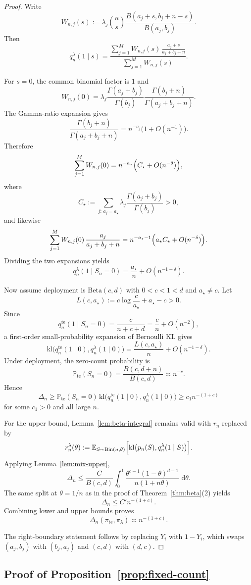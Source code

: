 \documentclass{article}
\theoremstyle{definition}
\theoremstyle{remark}
\newcommand{\E}{\mathbb{E}}
\newcommand{\Pbb}{\mathbb{P}}
\newcommand{\BetaDist}{\mathrm{Beta}}
\newcommand{\Bin}{\mathrm{Bin}}
\newcommand{\te}{\mathrm{te}}
\newcommand{\klb}{\mathrm{kl}}
\newcommand{\dd}{\,\mathrm{d}}
\begin{document}
\begin{proof}
	Write
	\[
W_{n,j}(s)
:=
\lambda_j \binom{n}{s}\frac{B(a_j+s,b_j+n-s)}{B(a_j,b_j)}.
\]
Then
\[
q_n^\lambda(1\mid s)
=
\frac{\sum_{j=1}^M W_{n,j}(s)\,\frac{a_j+s}{a_j+b_j+n}}
{\sum_{j=1}^M W_{n,j}(s)}.
\]

For $s=0$, the common binomial factor is $1$ and
\[
W_{n,j}(0)
=
\lambda_j \frac{\Gamma(a_j+b_j)}{\Gamma(b_j)}
\frac{\Gamma(b_j+n)}{\Gamma(a_j+b_j+n)}.
\]
The Gamma-ratio expansion gives
\[
\frac{\Gamma(b_j+n)}{\Gamma(a_j+b_j+n)}
=
n^{-a_j}\bigl(1+O(n^{-1})\bigr).
\]
Therefore
\[
\sum_{j=1}^M W_{n,j}(0)
=
n^{-a_\star}\Bigl(C_\star + O(n^{-\delta})\Bigr),
\]
where
\[
C_\star
:=
\sum_{j:\,a_j=a_\star}
\lambda_j\frac{\Gamma(a_j+b_j)}{\Gamma(b_j)}
>0,
\]
and likewise
\[
\sum_{j=1}^M W_{n,j}(0)\,\frac{a_j}{a_j+b_j+n}
=
n^{-a_\star-1}
\Bigl(a_\star C_\star + O(n^{-\delta})\Bigr).
\]
Dividing the two expansions yields
\[
q_n^\lambda(1\mid S_n=0)
=
\frac{a_\star}{n}+O(n^{-1-\delta}).
\]

Now assume deployment is $\BetaDist(c,d)$ with $0<c<1<d$ and $a_\star\neq c$. Let
\[
L(c,a_\star):=c\log\frac{c}{a_\star}+a_\star-c>0.
\]
Since
\[
q_n^{\te}(1\mid S_n=0)=\frac{c}{n+c+d}=\frac{c}{n}+O(n^{-2}),
\]
a first-order small-probability expansion of Bernoulli KL gives
\[
\klb\bigl(q_n^{\te}(1\mid 0),q_n^\lambda(1\mid 0)\bigr)
=
\frac{L(c,a_\star)}{n}+O(n^{-1-\delta}).
\]
Under deployment, the zero-count probability is
\[
\Pbb_{\te}(S_n=0)
=
\frac{B(c,d+n)}{B(c,d)}
\asymp n^{-c}.
\]
Hence
\[
\Delta_n
\ge
\Pbb_{\te}(S_n=0)\,
\klb\bigl(q_n^{\te}(1\mid 0),q_n^\lambda(1\mid 0)\bigr)
\ge
c_1 n^{-(1+c)}
\]
for some $c_1>0$ and all large $n$.

For the upper bound, Lemma~\ref{lem:beta-integral} remains valid with $r_n$ replaced by
\[
r_n^\lambda(\theta)
:=
\E_{S\sim \Bin(n,\theta)}
\Bigl[
\klb\bigl(p_n(S),q_n^\lambda(1\mid S)\bigr)
\Bigr].
\]
Applying Lemma~\ref{lem:mix-upper},
\[
\Delta_n
\le
\frac{C}{B(c,d)}
\int_0^1
\frac{\theta^{c-1}(1-\theta)^{d-1}}{n(1+n\theta)}\,\dd\theta.
\]
The same split at $\theta=1/n$ as in the proof of Theorem~\ref{thm:beta}(2) yields
\[
\Delta_n\le C' n^{-(1+c)}.
\]
Combining lower and upper bounds proves
\[
\Delta_n(\pi_{\te},\pi_\lambda)\asymp n^{-(1+c)}.
\]

	The right-boundary statement follows by replacing $Y_i$ with $1-Y_i$, which swaps $(a_j,b_j)$ with $(b_j,a_j)$ and $(c,d)$ with $(d,c)$.
\end{proof}

\subsection{Proof of Proposition~\ref{prop:fixed-count}}
\end{document}
